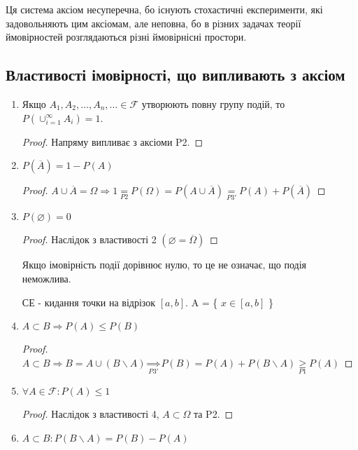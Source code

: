 Ця система аксіом несуперечна, бо існують стохастичні експерименти,
які задовольняють цим аксіомам, але неповна, бо в різних задачах
теорії ймовірностей розглядаються різні ймовірнісні простори.

\subsection{Властивості імовірності, що випливають з аксіом}
\begin{enumerate}
    \item Якщо $A_1, A_2, \dots, A_n, \dots \in \mathcal{F}$ утворюють повну групу 
    подій, то $P(\cup_{i=1}^\infty A_i) = 1$.
    \begin{proof}
        Напряму випливає з аксіоми P2.
    \end{proof}
    \item $P(\overline{A}) = 1 - P(A)$
    \begin{proof}
        $A \cup \overline{A} = \Omega \Rightarrow 1 \underset{P2}{=} P(\Omega) 
        = P(A \cup \overline{A}) \underset{P3'}{=} P(A) + P(\overline{A})$
    \end{proof}
    \item $P(\varnothing) = 0$
    \begin{proof}
        Наслідок з властивості 2 $(\varnothing = \overline{\Omega})$
    \end{proof}
    \begin{remark}
        Якщо імовірність події дорівнює нулю, то це не означає, що подія неможлива.
    \end{remark}
    \begin{example}
        СЕ - кидання точки на відрізок $[a, b]$. A = \{ $x \in [a, b]$ \}
    \end{example}
    \item $A \subset B \Rightarrow P(A) \leq P(B)$
    \begin{proof}
        $A \subset B \Rightarrow B = A \cup (B \backslash A) 
        \underset{P3'}{\Rightarrow} P(B) = P(A) + P(B \backslash A) 
        \underset{P1}{\geq} P(A)$
    \end{proof}
    \item $\forall A \in \mathcal{F}: P(A) \leq 1$
    \begin{proof}
        Наслідок з властивості 4, $A \subset \Omega$ та P2.
    \end{proof}
    \item $A \subset B: P(B \backslash A) = P(B) - P(A)$

\end{enumerate}
